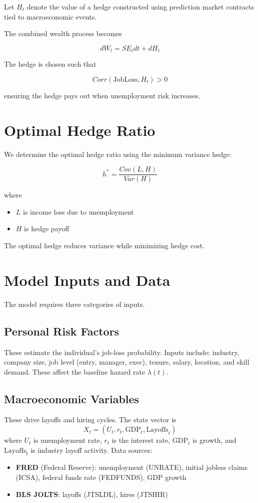 \documentclass[11pt]{article}
\begin{document}
Let $H_t$ denote the value of a hedge constructed using prediction market 
contracts tied to macroeconomic events.

The combined wealth process becomes

\[
dW_t = S E_t dt + dH_t
\]

The hedge is chosen such that

\[
Corr(\text{JobLoss}, H_t) > 0
\]

ensuring the hedge pays out when unemployment risk increases.

\section{Optimal Hedge Ratio}

We determine the optimal hedge ratio using the minimum variance hedge:

\[
h^* =
\frac{Cov(L, H)}{Var(H)}
\]

where

\begin{itemize}
\item $L$ is income loss due to unemployment
\item $H$ is hedge payoff
\end{itemize}

The optimal hedge reduces variance while minimizing hedge cost.

\section{Model Inputs and Data}

The model requires three categories of inputs.

\subsection{Personal Risk Factors}

These estimate the individual's job-loss probability. Inputs include:
industry, company size, job level (entry, manager, exec), tenure, salary, 
location, and skill demand. These affect the baseline hazard rate $\lambda(t)$.

\subsection{Macroeconomic Variables}

These drive layoffs and hiring cycles. The state vector is
\[
X_t = (U_t, r_t, \text{GDP}_t, \text{Layoffs}_t)
\]
where $U_t$ is unemployment rate, $r_t$ is the interest rate, $\text{GDP}_t$ 
is growth, and $\text{Layoffs}_t$ is industry layoff activity. Data sources:
\begin{itemize}
\item \textbf{FRED} (Federal Reserve): unemployment (UNRATE), initial jobless 
claims (ICSA), federal funds rate (FEDFUNDS), GDP growth
\item \textbf{BLS JOLTS}: layoffs (JTSLDL), hires (JTSHIR)
\end{itemize}
\end{document}
